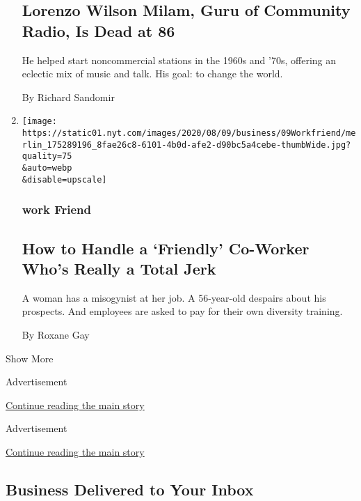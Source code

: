 \begin{enumerate}
  \hypertarget{lorenzo-wilson-milam-guru-of-community-radio-is-dead-at-86}{%
  \subsection{Lorenzo Wilson Milam, Guru of Community Radio, Is Dead at
  86}\label{lorenzo-wilson-milam-guru-of-community-radio-is-dead-at-86}}

  He helped start noncommercial stations in the 1960s and '70s, offering
  an eclectic mix of music and talk. His goal: to change the world.

  By Richard Sandomir
\item
  \href{/2020/08/07/business/how-to-handle-a-friendly-co-worker-whos-really-a-total-jerk.html}{}

  \texttt{[image: https://static01.nyt.com/images/2020/08/09/business/09Workfriend/merlin\_175289196\_8fae26c8-6101-4b0d-afe2-d90bc5a4cebe-thumbWide.jpg?quality=75\\\&auto=webp\\\&disable=upscale]}

  \hypertarget{work-friend}{%
  \subsubsection{work Friend}\label{work-friend}}

  \hypertarget{how-to-handle-a-friendly-co-worker-whos-really-a-total-jerk}{%
  \subsection{How to Handle a `Friendly' Co-Worker Who's Really a Total
  Jerk}\label{how-to-handle-a-friendly-co-worker-whos-really-a-total-jerk}}

  A woman has a misogynist at her job. A 56-year-old despairs about his
  prospects. And employees are asked to pay for their own diversity
  training.

  By Roxane Gay
\end{enumerate}

Show More

Advertisement

\protect\hyperlink{after-mid2}{Continue reading the main story}

Advertisement

\protect\hyperlink{after-mktg}{Continue reading the main story}

\hypertarget{business-delivered-to-your-inbox}{%
\subsection{Business Delivered to Your
Inbox}\label{business-delivered-to-your-inbox}}

